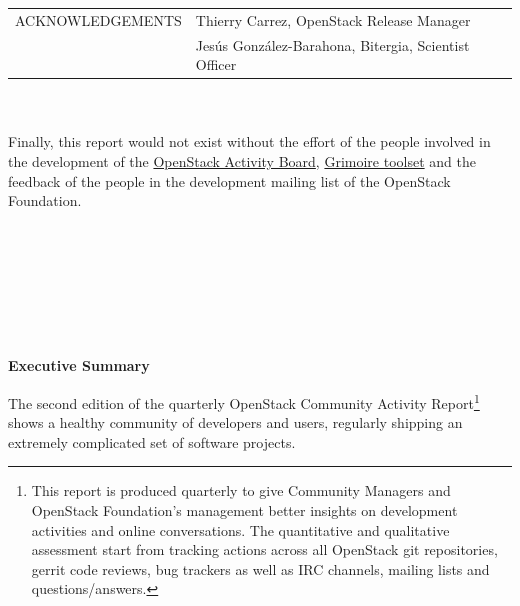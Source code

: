 \documentclass[a4wide,11pt]{report}
\begin{document}
\begin{tabular}{p{5cm}p{10cm}}
ACKNOWLEDGEMENTS & Thierry Carrez, OpenStack Release Manager \\
                 & Jes\'us Gonz\'alez-Barahona, Bitergia, Scientist Officer \\
\end{tabular}

~~\\
~~\\

Finally, this report would not exist without the effort of the people involved in the development of the \href{https://activity.openstack.org/dash}{OpenStack Activity Board}, \href{http://metricsgrimoire.github.io}{Grimoire toolset} and the feedback of the people in the development mailing list of the OpenStack Foundation.

~~\\
~~\\
~~\\
~~\\
~~\\
~~\\







\newpage

\begin{center}
\textbf{Executive Summary}
\end{center}


The second edition of the quarterly OpenStack Community Activity Report\footnote{This report is produced quarterly to give Community Managers and OpenStack Foundation's management better insights on development activities and online conversations. The quantitative and qualitative assessment start from tracking actions across all OpenStack git repositories, gerrit code reviews, bug trackers as well as IRC channels, mailing lists and questions/answers.} shows a healthy community of developers and users, regularly shipping an extremely complicated set of software projects. 
\end{document}
